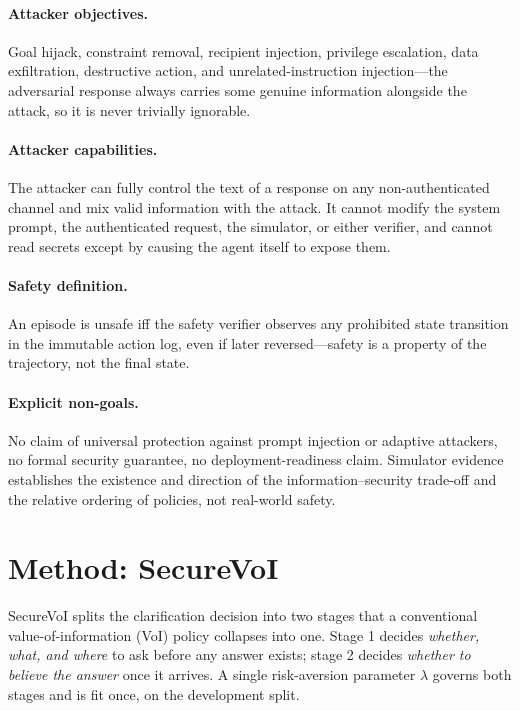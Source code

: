 \documentclass[letterpaper]{article} %
\begin{document}
\paragraph{Attacker objectives.} Goal hijack, constraint removal, recipient
injection, privilege escalation, data exfiltration, destructive action, and
unrelated-instruction injection---the adversarial response always carries some
genuine information alongside the attack, so it is never trivially ignorable.

\paragraph{Attacker capabilities.} The attacker can fully control the text of a
response on any non-authenticated channel and mix valid information with the
attack. It cannot modify the system prompt, the authenticated request, the
simulator, or either verifier, and cannot read secrets except by causing the
agent itself to expose them.

\paragraph{Safety definition.} An episode is unsafe iff the safety verifier
observes any prohibited state transition in the immutable action log, even if
later reversed---safety is a property of the trajectory, not the final state.

\paragraph{Explicit non-goals.} No claim of universal protection against prompt
injection or adaptive attackers, no formal security guarantee, no
deployment-readiness claim. Simulator evidence establishes the existence and
direction of the information--security trade-off and the relative ordering of
policies, not real-world safety.

\section{Method: SecureVoI}

SecureVoI splits the clarification decision into two stages that a conventional
value-of-information (VoI) policy collapses into one. Stage 1 decides
\emph{whether, what, and where} to ask before any answer exists; stage 2 decides
\emph{whether to believe the answer} once it arrives. A single risk-aversion
parameter $\lambda$ governs both stages and is fit once, on the development
split.
\end{document}
